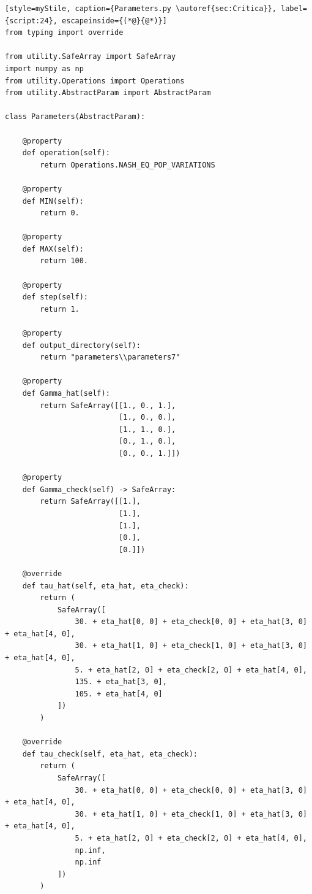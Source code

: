 \begin{lstlisting}[style=myStile, caption={Parameters.py \autoref{sec:Critica}}, label={script:24}, escapeinside={(*@}{@*)}]
from typing import override

from utility.SafeArray import SafeArray
import numpy as np
from utility.Operations import Operations
from utility.AbstractParam import AbstractParam

class Parameters(AbstractParam):

    @property
    def operation(self):
        return Operations.NASH_EQ_POP_VARIATIONS

    @property
    def MIN(self):
        return 0.

    @property
    def MAX(self):
        return 100.

    @property
    def step(self):
        return 1.
    
    @property
    def output_directory(self):
        return "parameters\\parameters7"

    @property
    def Gamma_hat(self):
        return SafeArray([[1., 0., 1.],
                          [1., 0., 0.],
                          [1., 1., 0.],
                          [0., 1., 0.],
                          [0., 0., 1.]])
    
    @property
    def Gamma_check(self) -> SafeArray:
        return SafeArray([[1.],
                          [1.],
                          [1.],
                          [0.],
                          [0.]])
    
    @override
    def tau_hat(self, eta_hat, eta_check):        
        return (
            SafeArray([
                30. + eta_hat[0, 0] + eta_check[0, 0] + eta_hat[3, 0] + eta_hat[4, 0],
                30. + eta_hat[1, 0] + eta_check[1, 0] + eta_hat[3, 0] + eta_hat[4, 0],
                5. + eta_hat[2, 0] + eta_check[2, 0] + eta_hat[4, 0],
                135. + eta_hat[3, 0],
                105. + eta_hat[4, 0]
            ])
        )
    
    @override
    def tau_check(self, eta_hat, eta_check):
        return (
            SafeArray([
                30. + eta_hat[0, 0] + eta_check[0, 0] + eta_hat[3, 0] + eta_hat[4, 0],
                30. + eta_hat[1, 0] + eta_check[1, 0] + eta_hat[3, 0] + eta_hat[4, 0],
                5. + eta_hat[2, 0] + eta_check[2, 0] + eta_hat[4, 0],
                np.inf,
                np.inf
            ])
        )
\end{lstlisting}

